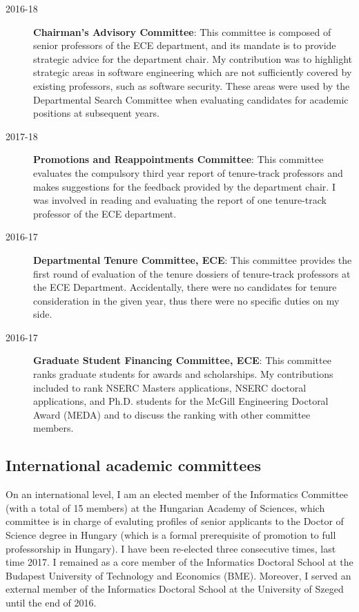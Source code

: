 \begin{description}
\item[2016-18] \textbf{Chairman's Advisory Committee}: This committee is composed of senior professors of the ECE department, and its mandate is to provide strategic advice for the department chair. My contribution was to highlight strategic areas in software engineering which are not sufficiently covered by existing professors, such as software security. These areas were used by the Departmental Search Committee when evaluating candidates for academic positions at subsequent years.
\item[2017-18] \textbf{Promotions and Reappointments Committee}: This committee evaluates the compulsory third year report of tenure-track professors and makes suggestions for the feedback provided by the department chair. I was involved in reading and evaluating the report of one tenure-track professor of the ECE department. 
\item[2016-17] \textbf{Departmental Tenure Committee, ECE}: This committee provides the first round of evaluation of the tenure dossiers of tenure-track professors at the ECE Department. Accidentally, there were no candidates for tenure consideration in the given year, thus there were no specific duties on my side. 
\item[2016-17] \textbf{Graduate Student Financing Committee, ECE}: This committee ranks graduate students for awards and scholarships. My contributions included to rank NSERC Masters applications, NSERC doctoral applications, and Ph.D. students for the McGill Engineering Doctoral Award (MEDA) and to discuss the ranking with other committee members.
\end{description}

\subsection{International academic committees}
On an international level, I am an elected member of the Informatics Committee (with a total of 15 members) at the Hungarian Academy of Sciences, which committee is in charge of evaluting profiles of senior applicants to the Doctor of Science degree in Hungary (which is a formal prerequisite of promotion to full professorship in Hungary). I have been re-elected three consecutive times, last time 2017. I remained as a core member of the Informatics Doctoral School at the Budapest University of Technology and Economics (BME). Moreover, I served an external member of the Informatics Doctoral School at the University of Szeged until the end of 2016.


 
